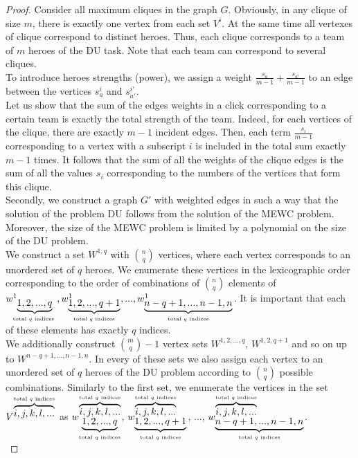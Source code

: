 \documentclass[smallextended]{svjour3}       %
\begin{document}
\begin{proof}
    Consider all maximum cliques in the graph $G$. Obviously, in any clique of size $m$, there is exactly one vertex from each set $ V^i $. At the same time all vertexes of clique correspond to distinct heroes. Thus, each clique corresponds to a team of $m$ heroes of the DU task. Note that each team can correspond to several cliques.\\  
    To introduce heroes strengths (power), we assign a weight $ \frac{s_a}{m-1} + \frac{s_{a '}}{m-1}$ to an edge between the vertices $s_a^i$ and $s_ {a'}^{i'}$.\\
    Let us show that the sum of the edges weights in a click corresponding to a certain team is exactly the total strength of the team. Indeed, for each vertices of the clique, there are exactly $m-1$ incident edges. Then, each term $\frac{s_i}{m-1}$ corresponding to a vertex with a subscript $i$ is included in the total sum exactly $m-1$ times. It follows that the sum of all the weights of the clique edges is the sum of all the values $s_i$ corresponding to the numbers of the vertices that form this clique.\\          
Secondly, we construct a graph $G'$ with weighted edges in such a way that the solution of the problem DU follows from the solution of the MEWC problem. Moreover, the size of the MEWC problem is limited by a polynomial on the size of the DU problem.\\
    We construct a set $W^{1,q} $ with $\binom{n}{q} $ vertices, where each vertex corresponds to an unordered set of $q$ heroes. We enumerate these vertices in the lexicographic order corresponding to the order of  combinations of $ \binom {n}{q} $ elements of $ w^1_ {\underbrace {1,2, ..., q}_\text{total $ q $ indices }}, w^1_{\underbrace {1,2, ..., q + 1}_\text {total $ q $ indices}}, ..., w^1_ {\underbrace{n-q+1, ..., n-1, n}_\text{total $ q $ indices}} $. It is important that each of these elements has exactly $q$ indices.\\
We additionally construct $ \binom{m}{q}-1 $ vertex sets $ W^{1,2, ..., q} $, $W^{1,2, q + 1} $ and so on up to $ W^{n-q + 1, ..., n-1, n} $. In every of these sets we also assign each vertex to an unordered set of $q$ heroes of the DU problem according to $\binom{n}{q}$ possible combinations. Similarly to the first set, we enumerate the vertices in the set $V^{\overbrace {i, j, k, l, ...}^\text {total $ q $ indices}} $ as $w_{\underbrace {1,2, ..., q}_\text {total $ q $ indices}}^{\overbrace{i, j, k, l, ...}^\text{total $ q $ indices}} $, $w_{ \underbrace {1,2, ..., q + 1}_\text{total $ q $ indices}}^{\overbrace{i, j, k, l, ...} ^\text{total $ q $ indices}} $,  ..., $w_{\underbrace {n-q + 1, ..., n-1, n}_\text{total $ q $ indices}}^{\overbrace { i, j, k, l, ...}^\text {total $ q $ indices}} $.\\

\end{proof}
\end{document}
